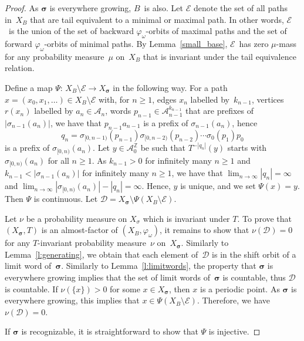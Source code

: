\documentclass{amsart}
\theoremstyle{definition}
\theoremstyle{remark}
\numberwithin{equation}{section}
\begin{document}
\begin{proof}
As $\boldsymbol{\sigma}$ is everywhere growing, $B$~is also.   
Let $\mathcal{E}$ denote the set of all paths in~$X_B$ that are tail equivalent to a minimal or maximal path. 
In other words, $\mathcal{E}$~is the union of the set of backward $\varphi_\omega$-orbits of maximal paths and the set of forward $\varphi_\omega$-orbits of minimal paths.  
By Lemma~\ref{small_base}, $\mathcal{E}$~has zero $\mu$-mass for any probability measure~$\mu$ on~$X_B$ that is invariant under the tail equivalence relation.

Define a map $\Psi:\, X_B \setminus \mathcal{E} \to X_{\boldsymbol{\sigma}}$ in the following way.
For a path $x = (x_0,x_1,\dots) \in X_B \setminus \mathcal{E}$ with, for $n \ge 1$, edges $x_n$ labelled by~$k_{n-1}$, vertices $r(x_n)$ labelled by $a_n \in \mathcal{A}_n$, words $p_{n-1} \in \mathcal{A}_{n-1}^{k_{n-1}}$ that are prefixes of $|\sigma_{n-1}(a_n)|$, we have that $p_{n-1} a_{n-1}$ is a prefix of $\sigma_{n-1}(a_n)$, hence
\[
q_n = \sigma_{[0,n-1)}(p_{n-1}) \sigma_{[0,n-2)}(p_{n-2}) \cdots \sigma_0(p_1) p_0
\]
is a prefix of $\sigma_{[0,n)}(a_n)$.
Let $y \in \mathcal{A}_0^\mathbb{Z}$ be such that $T^{-|q_n|}(y)$ starts with $\sigma_{[0,n)}(a_n)$ for all $n \ge 1$. 
As $k_{n-1} > 0$ for infinitely many $n \ge 1$ and $k_{n-1} < |\sigma_{n-1}(a_n)|$ for infinitely many $n \ge 1$, we have that $\lim_{n\to\infty} |q_n| = \infty$ and $\lim_{n\to\infty} |\sigma_{[0,n)}(a_n)| - |q_n| = \infty$.
Hence, $y$ is unique, and we set $\Psi(x) = y$.
Then $\Psi$ is continuous.
Let $\mathcal{D} = X_{\boldsymbol{\sigma}} \setminus \Psi(X_B \setminus \mathcal{E})$.

Let $\nu$ be a probability  measure on $X_{\sigma}$ which is  invariant under $T$. To prove that $(X_{\boldsymbol{\sigma}},T)$ is an almost-factor of $(X_B, \varphi_\omega)$, it remains to show that $\nu(\mathcal{D}) = 0$ for any $T$-invariant probability measure~$\nu$ on~$X_{\boldsymbol{\sigma}}$.
Similarly to Lemma~\ref{l:generating}, we obtain that each element of~$\mathcal{D}$ is in the shift orbit of a limit word of~$\boldsymbol{\sigma}$.
Similarly to Lemma~\ref{l:limitwords}, the property that $\boldsymbol{\sigma}$ is everywhere growing implies that the set of limit words of~$\boldsymbol{\sigma}$ is countable, thus $\mathcal{D}$ is countable.  
If $\nu(\{x\}) > 0$ for some $x \in X_{\boldsymbol{\sigma}}$, then $x$ is a periodic point.
As $\boldsymbol{\sigma}$ is everywhere growing, this implies that $x \in \Psi(X_B \setminus \mathcal{E})$.
Therefore, we have $\nu(\mathcal{D}) = 0$.

If $\boldsymbol{\sigma}$ is recognizable, it is straightforward to show that $\Psi$ is injective.
\end{proof}
\end{document}
